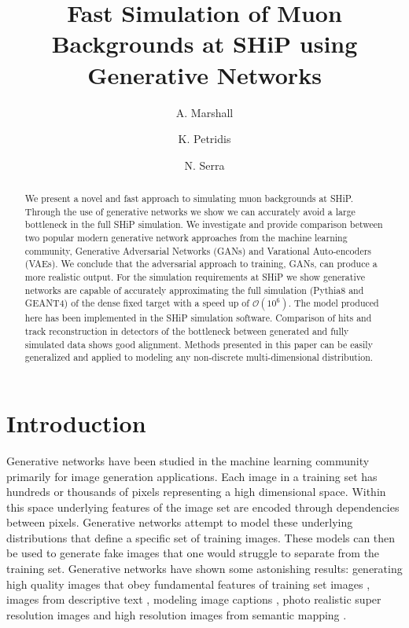 \documentclass{article}
\title{Fast Simulation of Muon Backgrounds at SHiP using Generative Networks}
\author[1]{A. Marshall}
\author[1]{K. Petridis}
\author[2]{N. Serra}
\affil[1]{HH Wills Physics Laboratory, University of Bristol}
\affil[2]{Physics Institute, University of Zurich}
\begin{document}
\maketitle

\begin{abstract}
    We present a novel and fast approach to simulating muon backgrounds at SHiP. Through the use of generative networks we show we can accurately avoid a large bottleneck in the full SHiP simulation. We investigate and provide comparison between two popular modern generative network approaches from the machine learning community, Generative Adversarial Networks (GANs) and Varational Auto-encoders (VAEs). We conclude that the adversarial approach to training, GANs, can produce a more realistic output.  For the simulation requirements at SHiP we show generative networks are capable of accurately approximating the full simulation (Pythia8 and GEANT4) of the dense fixed target with a speed up of $\mathcal{O}(10^6)$. The model produced here has been implemented in the SHiP simulation software. Comparison of hits and track reconstruction in detectors of the bottleneck between generated and fully simulated data shows good alignment. Methods presented in this paper can be easily generalized and applied to modeling any non-discrete multi-dimensional distribution.
\end{abstract}

\section{Introduction}\label{intro}

    Generative networks have been studied in the machine learning community primarily for image generation applications. Each image in a training set has hundreds or thousands of pixels representing a high dimensional space. Within this space underlying features of the image set are encoded through dependencies between pixels. Generative networks attempt to model these underlying distributions that define a specific set of training images. These models can then be used to generate fake images that one would struggle to separate from the training set. Generative networks have shown some astonishing results: generating high quality images that obey fundamental features of training set images \cite{radford2015unsupervised} \cite{gregor2015draw}, images from descriptive text \cite{zhang2017stackgan}, modeling image captions \cite{pu2016variational}, photo realistic super resolution images \cite{ledig2017photo} and high resolution images from semantic mapping \cite{wang2018high} \cite{isola2017image}.
    
\end{document}
